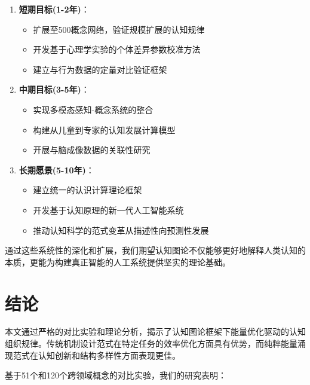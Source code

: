 \documentclass[12pt,a4paper]{article}
\begin{document}
\begin{enumerate}
\item \textbf{短期目标(1-2年)}：
\begin{itemize}
\item 扩展至500概念网络，验证规模扩展的认知规律
\item 开发基于心理学实验的个体差异参数校准方法
\item 建立与行为数据的定量对比验证框架
\end{itemize}

\item \textbf{中期目标(3-5年)}：
\begin{itemize}
\item 实现多模态感知-概念系统的整合
\item 构建从儿童到专家的认知发展计算模型
\item 开展与脑成像数据的关联性研究
\end{itemize}

\item \textbf{长期愿景(5-10年)}：
\begin{itemize}
\item 建立统一的认识计算理论框架
\item 开发基于认知原理的新一代人工智能系统
\item 推动认知科学的范式变革从描述性向预测性发展
\end{itemize}
\end{enumerate}

通过这些系统性的深化和扩展，我们期望认知图论不仅能够更好地解释人类认知的本质，更能为构建真正智能的人工系统提供坚实的理论基础。

\section{结论}

本文通过严格的对比实验和理论分析，揭示了认知图论框架下能量优化驱动的认知组织规律。传统机制设计范式在特定任务的效率优化方面具有优势，而纯粹能量涌现范式在认知创新和结构多样性方面表现更佳。

基于51个和120个跨领域概念的对比实验，我们的研究表明：
\end{document}
